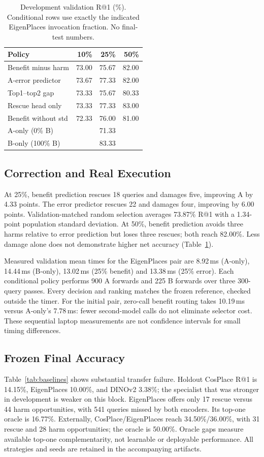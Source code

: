 \documentclass[conference]{IEEEtran}
\begin{document}
\begin{table}[t]
\caption{Development validation R@1 (\%). Conditional rows use exactly the
indicated EigenPlaces invocation fraction. No final-test numbers.}
\label{tab:development}
\centering
\begin{tabular}{lrrr}
\toprule
Policy & 10\% & 25\% & 50\%\\
\midrule
Benefit minus harm &73.00&75.67&82.00\\
A-error predictor &73.67&77.33&82.00\\
Top1--top2 gap &73.33&75.67&80.33\\
Rescue head only &73.33&77.33&83.00\\
Benefit without std &72.33&76.00&81.00\\
\midrule
A-only (0\% B)&\multicolumn{3}{c}{71.33}\\
B-only (100\% B)&\multicolumn{3}{c}{83.33}\\
\bottomrule
\end{tabular}
\end{table}

\subsection{Correction and Real Execution}
At 25\%, benefit prediction rescues 18 queries and damages five, improving
A by 4.33 points. The error predictor rescues 22 and damages four, improving
by 6.00 points. Validation-matched random selection averages 73.87\% R@1
with a 1.34-point population standard deviation. At 50\%, benefit prediction
avoids three harms relative to error prediction but loses three rescues;
both reach 82.00\%. Less damage alone does not demonstrate higher net
accuracy (Table~\ref{tab:development}).

Measured validation mean times for the EigenPlaces pair are 8.92\,ms
(A-only), 14.44\,ms (B-only), 13.02\,ms (25\% benefit) and 13.38\,ms
(25\% error). Each conditional policy performs 900 A forwards and 225 B
forwards over three 300-query passes. Every decision and ranking matches
the frozen reference, checked outside the timer. For the initial pair,
zero-call benefit routing takes 10.19\,ms versus A-only's 7.78\,ms: fewer
second-model calls do not eliminate selector cost. These sequential laptop
measurements are not confidence intervals for small timing differences.

\subsection{Frozen Final Accuracy}
Table~\ref{tab:baselines} shows substantial transfer failure. Holdout
CosPlace R@1 is 14.15\%, EigenPlaces 10.00\%, and DINOv2 3.38\%; the
specialist that was stronger in development is weaker on this block.
EigenPlaces offers only 17 rescue versus 44 harm opportunities, with
541 queries missed by both encoders. Its top-one oracle is 16.77\%.
Externally, CosPlace/EigenPlaces reach 34.50\%/36.00\%, with 31 rescue
and 28 harm opportunities; the oracle is 50.00\%. Oracle gaps measure
available top-one complementarity, not learnable or deployable performance.
All strategies and seeds are retained in the accompanying artifacts.
\end{document}
